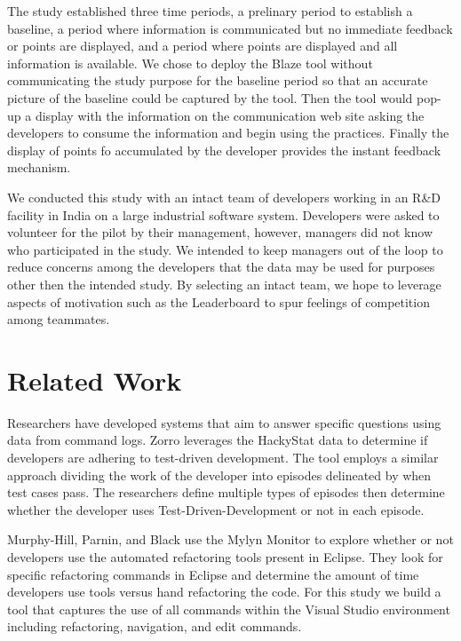\documentclass{sig-alternate}
\begin{document}
The study established three time periods, a prelinary period to establish a baseline, a period where information is communicated but no immediate feedback or points are displayed, and a period where points are displayed and all information is available.  We chose to deploy the Blaze tool without communicating the study purpose for the baseline period so that an accurate picture of the baseline could be captured by the tool.  Then the tool would pop-up a display with the information on the communication web site asking the developers to consume the information and begin using the practices.   Finally the display of points fo accumulated by the developer provides the instant feedback mechanism.  

We conducted this study with an intact team of developers working in an R\&D facility in India on a large industrial software system.  Developers were asked to volunteer for the pilot by their management, however, managers did not know who participated in the study.  We intended to keep managers out of the loop to reduce concerns among the developers that the data may be used for purposes other then the intended study.  By selecting an intact team, we hope to leverage aspects of motivation such as the Leaderboard to spur feelings of competition among teammates.  

\section{Related Work}
Researchers have developed systems that aim to answer specific questions using data from command logs. Zorro \cite{V:Johnson2007Automated} leverages the HackyStat data to determine if developers are adhering to test-driven development.  The tool employs a similar approach dividing the work of the developer into episodes delineated by when test cases pass.  The researchers define multiple types of episodes then determine whether the developer uses Test-Driven-Development or not in each episode.  

Murphy-Hill, Parnin, and Black \cite{V:MurphyHill2012How} use the Mylyn Monitor to explore whether or not developers use the automated refactoring tools present in Eclipse.  They look for specific refactoring commands in Eclipse and determine the amount of time developers use tools versus hand refactoring the code.  For this study we build a tool that captures the use of all commands within the Visual Studio environment including refactoring, navigation, and edit commands.
\end{document}
